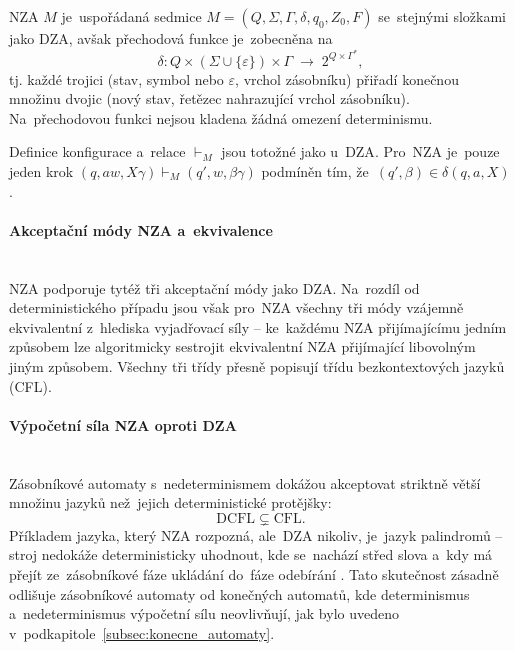 \documentclass[
  master,
  program=ainfvs,
  printversion,
  figures=false,
  tables=false,
  glossaries,
  index
]{kidiplom}
\begin{document}
\begin{definition}
\gls{NZA} $M$ je~uspořádaná sedmice
$M = (Q, \Sigma, \Gamma, \delta, q_0, Z_0, F)$ se~stejnými složkami jako \gls{DZA},
avšak přechodová funkce je~zobecněna na
\[
\delta : Q \times (\Sigma \cup \{\varepsilon\}) \times \Gamma
         \;\longrightarrow\; 2^{Q \times \Gamma^*},
\]
tj. každé trojici (stav, symbol nebo $\varepsilon$, vrchol zásobníku) přiřadí
konečnou množinu dvojic (nový stav, řetězec nahrazující vrchol zásobníku).
Na~přechodovou funkci nejsou kladena žádná omezení determinismu.
\end{definition}

Definice konfigurace a~relace $\vdash_M$ jsou totožné jako u~\gls{DZA}.
Pro~\gls{NZA} je~pouze jeden krok $(q, aw, X\gamma) \vdash_M (q', w, \beta\gamma)$
podmíněn tím, že~$(q', \beta) \in \delta(q, a, X)$.

\paragraph{Akceptační módy \gls{NZA} a~ekvivalence} \mbox{} \\
\gls{NZA} podporuje tytéž tři akceptační módy jako \gls{DZA}. Na~rozdíl od
deterministického případu jsou však pro~\gls{NZA} všechny tři módy vzájemně
ekvivalentní z~hlediska vyjadřovací síly -- ke~každému \gls{NZA} přijímajícímu
jedním způsobem lze algoritmicky sestrojit ekvivalentní \gls{NZA} přijímající
libovolným jiným způsobem. Všechny tři třídy přesně popisují třídu
bezkontextových jazyků (CFL).

\paragraph{Výpočetní síla \gls{NZA} oproti \gls{DZA}} \mbox{} \\
Zásobníkové automaty s~nedeterminismem dokážou akceptovat striktně větší množinu
jazyků než~jejich deterministické protějšky:
\[
\mathrm{DCFL} \subsetneq \mathrm{CFL}.
\]
Příkladem jazyka, který \gls{NZA} rozpozná, ale~\gls{DZA} nikoliv, je~jazyk
palindromů -- stroj nedokáže deterministicky uhodnout, kde se~nachází střed slova
a~kdy má přejít ze~zásobníkové fáze ukládání do~fáze odebírání
\cite{cerna_fja}. Tato skutečnost zásadně odlišuje zásobníkové automaty od
konečných automatů, kde determinismus a~nedeterminismus výpočetní sílu neovlivňují, jak bylo uvedeno v~podkapitole~\ref{subsec:konecne_automaty}.
\newpage
\end{document}
